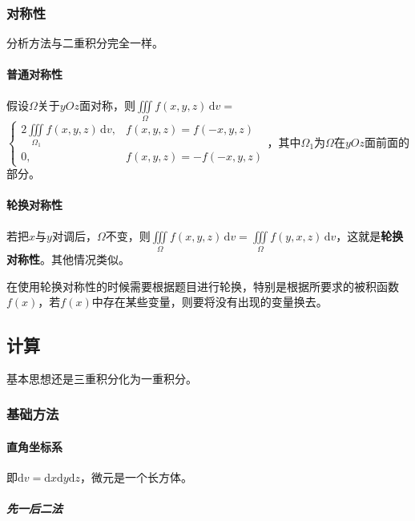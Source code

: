 \subsubsection{对称性}

分析方法与二重积分完全一样。

\paragraph{普通对称性} \leavevmode \medskip

假设$\Omega$关于$yOz$面对称，则$\iiint\limits_\Omega f(x,y,z)\,\textrm{d}v=$\\$\left\{\begin{array}{ll}
    2\iiint\limits_{\Omega_1}f(x,y,z)\,\textrm{d}v, & f(x,y,z)=f(-x,y,z) \\
    0, & f(x,y,z)=-f(-x,y,z)
\end{array}\right.$，其中$\Omega_1$为$\Omega$在$yOz$面前面的部分。

\paragraph{轮换对称性} \leavevmode \medskip

若把$x$与$y$对调后，$\Omega$不变，则$\iiint\limits_\Omega f(x,y,z)\,\textrm{d}v=\iiint\limits_\Omega f(y,x,z)\,\textrm{d}v$，这就是\textbf{轮换对称性}。其他情况类似。

在使用轮换对称性的时候需要根据题目进行轮换，特别是根据所要求的被积函数$f(x)$，若$f(x)$中存在某些变量，则要将没有出现的变量换去。

\subsection{计算}

基本思想还是三重积分化为一重积分。

\subsubsection{基础方法}

\paragraph{直角坐标系} \leavevmode \medskip

即$\textrm{d}v=\textrm{d}x\textrm{d}y\textrm{d}z$，微元是一个长方体。

\subparagraph{先一后二法} \leavevmode \medskip

